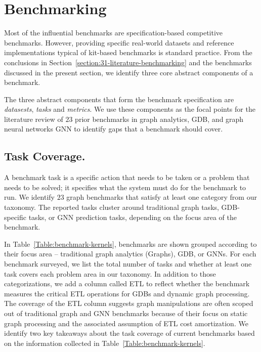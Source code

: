 \section{Benchmarking \gai}
\label{section:32-literature-benchmarking-gai}
Most of the influential \gai benchmarks are specification-based competitive benchmarks. 
However, providing specific real-world datasets and reference implementations typical of kit-based benchmarks is standard practice. 
From the conclusions in Section~\ref{section:31-literature-benchmarking} and the benchmarks discussed in the present section, we identify three core abstract components of a benchmark.

The three abstract components that form the benchmark specification are \textit{datasests}, \textit{tasks} and \textit{metrics}.
We use these components as the focal points for the literature review of $23$ prior benchmarks in graph analytics, \ac{GDB}, and graph neural networks \ac{GNN} to identify gaps that a \gai benchmark should cover.



\subsection{Task Coverage.}
A benchmark task is a specific action that needs to be taken or a problem that needs to be solved; it specifies what the system must do for the benchmark to run.
We identify $23$ graph benchmarks that satisfy at least one category from our \gai taxonomy.
The reported tasks cluster around traditional graph tasks, \ac{GDB}-specific tasks, or \ac{GNN} prediction tasks, depending on the focus area of the benchmark.

In  Table~\ref{Table:benchmark-kernels}, benchmarks are shown grouped according to their focus area -- traditional graph analytics (Graphs), \ac{GDB}, or \ac{GNN}s.
For each benchmark surveyed, we list the total number of tasks and whether at least one task covers each problem area in our \gai taxonomy.
In addition to those categorizations, we add a column called \ac{ETL} to reflect whether the benchmark measures the critical \ac{ETL} operations for \ac{GDB}s and dynamic graph processing. 
The coverage of the \ac{ETL} column suggests graph manipulations are often scoped out of traditional graph and \ac{GNN} benchmarks because of their focus on static graph processing and the associated assumption of \ac{ETL} cost amortization.
We identify two key takeaways about the task coverage of current \gai benchmarks based on the information collected in  Table~\ref{Table:benchmark-kernels}.

